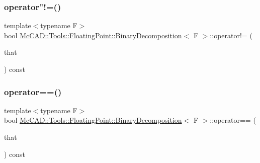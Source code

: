 \subsubsection{\texorpdfstring{operator"!=()}{operator!=()}}
{\footnotesize\ttfamily template$<$typename F$>$ \\
bool \hyperlink{classMcCAD_1_1Tools_1_1FloatingPoint_1_1BinaryDecomposition}{Mc\+C\+A\+D\+::\+Tools\+::\+Floating\+Point\+::\+Binary\+Decomposition}$<$ F $>$\+::operator!= (\begin{DoxyParamCaption}\item[{const \hyperlink{classMcCAD_1_1Tools_1_1FloatingPoint_1_1BinaryDecomposition}{Binary\+Decomposition}$<$ F $>$ \&}]{that }\end{DoxyParamCaption}) const}

\mbox{\label{classMcCAD_1_1Tools_1_1FloatingPoint_1_1BinaryDecomposition_a2fea4f7df1137b46f1ddc264aca03166}} 
\subsubsection{\texorpdfstring{operator==()}{operator==()}}
{\footnotesize\ttfamily template$<$typename F$>$ \\
bool \hyperlink{classMcCAD_1_1Tools_1_1FloatingPoint_1_1BinaryDecomposition}{Mc\+C\+A\+D\+::\+Tools\+::\+Floating\+Point\+::\+Binary\+Decomposition}$<$ F $>$\+::operator== (\begin{DoxyParamCaption}\item[{const \hyperlink{classMcCAD_1_1Tools_1_1FloatingPoint_1_1BinaryDecomposition}{Binary\+Decomposition}$<$ F $>$ \&}]{that }\end{DoxyParamCaption}) const}

\mbox{\label{classMcCAD_1_1Tools_1_1FloatingPoint_1_1BinaryDecomposition_af475b04f2cc3c32c3f8962701711d554}} 
